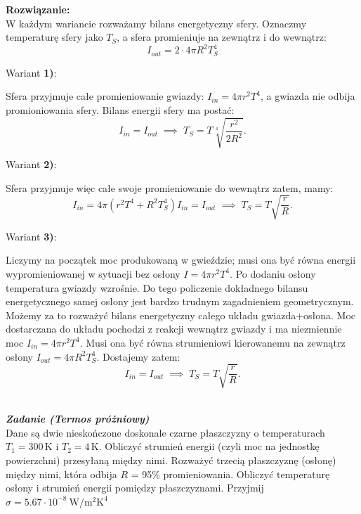 \documentclass[11pt,a4paper]{article}
\newcounter{zadanie}\newcommand{\zadanie}[1][]{\addtocounter{zadanie}{1} ~\\  {\bf \emph{Zadanie \arabic{zadanie} #1 }} \\}
\begin{document}
\vskip 10pt
\textbf{Rozwiązanie:}\\

W każdym wariancie rozważamy bilans energetyczny sfery.
Oznaczmy temperaturę sfery jako $T_{S}$, a sfera promieniuje na zewnątrz i do wewnątrz:
\begin{equation}
I_{out} = 2 \cdot 4 \pi R^2 T_{S}^4
\end{equation}

Wariant {\bf 1)}:

Sfera przyjmuje całe promieniowanie gwiazdy: $I_{in} = 4 \pi r^2 T^4$, a gwiazda nie odbija promioniowania sfery.   
Bilans energii sfery ma postać:
\begin{equation}
I_{in} = I_{out} \; \implies \; T_{S} = T \sqrt[4]{\frac{r^2}{2R^2}}.
\end{equation}

Wariant {\bf 2)}:

Sfera przyjmuje więc całe swoje promieniowanie do wewnątrz zatem, mamy:
\begin{equation}
I_{in} = 4 \pi \left( r^2 T^4 +  R^2 T_{S}^4\right)
I_{in} = I_{out} \; \implies \; T_{S} = T \sqrt{\frac{r}{R}}.
\end{equation}

Wariant {\bf 3)}:

Liczymy na początek moc produkowaną w gwieździe; musi ona być równa energii wypromieniowanej
w sytuacji bez osłony $I = 4 \pi r^2 T^4$. Po dodaniu osłony temperatura gwiazdy wzrośnie.
Do tego policzenie dokładnego bilansu energetycznego samej osłony jest bardzo trudnym zagadnieniem
geometrycznym. Możemy za to rozważyć bilans energetyczny całego układu gwiazda+osłona.
Moc dostarczana do układu pochodzi z reakcji wewnątrz gwiazdy i ma niezmiennie moc
$I_{in} = 4 \pi r^2 T^4$. Musi ona być równa strumieniowi kierowanemu na zewnątrz osłony
$I_{out} = 4\pi R^2 T_{S}^4$. Dostajemy zatem:
\begin{equation}
I_{in} = I_{out} \; \implies \; T_{S} = T \sqrt{\frac{r}{R}}.
\end{equation}

\newpage

\zadanie [(Termos próżniowy)]
Dane są dwie nieskończone doskonale czarne płaszczyzny o temperaturach $T_1=300\,$K i $T_2=4$\,K.
Obliczyć strumień energii (czyli moc na jednostkę powierzchni)
przesyłaną między nimi. Rozważyć trzecią płaszczyznę (osłonę)
między nimi, która odbija $R$ = 95\% promieniowania. 
Obliczyć temperaturę osłony i strumień energii pomiędzy płaszczyznami.
Przyjmij $\sigma = 5.67\cdot 10^{-8}~\mathrm{W/m^{2}K^{4}}$
\end{document}
